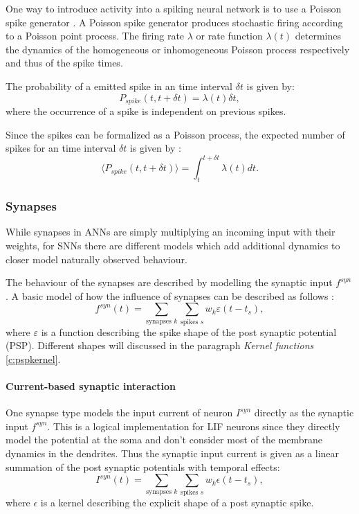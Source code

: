 One way to introduce activity into a spiking neural network is to use a Poisson spike generator \cite{Heeger2000}.
A Poisson spike generator produces stochastic firing according to a Poisson point process.
The firing rate $\lambda$ or rate function $\lambda(t)$ determines the dynamics of the homogeneous or inhomogeneous Poisson process respectively and thus of the spike times.   

The probability of a emitted spike in an time interval $\delta t$ is given by: 
\[
P_{spike}({t , t+ \delta t}) = \lambda(t) \delta t,
\]
where the occurrence of a spike is independent on previous spikes. 

Since the spikes can be formalized as a Poisson process, the expected number of spikes for an time interval $\delta t$ is given by :
\[
\langle  P_{spike}({t , t+ \delta t}) \rangle = \int_t^{t + \delta t} \lambda(t) dt.
\]


\subsubsection{Synapses} \label{c:synapses}

While synapses in ANNs are simply multiplying an incoming input with their weights, for SNNs there are different models which add additional dynamics to closer model naturally observed behaviour. 

The behaviour of the synapses are described by modelling the synaptic input $f^{syn}$. A basic model of how the influence of synapses can be described as follows \cite{Petrovici2016}:
\[
f^{syn}(t) = \sum_{\text{synapses } k } \sum_{\text{spikes } s} w_k \varepsilon(t - t_s),
\]
where $\varepsilon$ is a function describing the spike shape of the post synaptic potential (PSP).
Different shapes will discussed in the paragraph \textit{Kernel functions} \ref{c:pspkernel}.

\paragraph{Current-based synaptic interaction} \label{c:cuba}
One synapse type models the input current of neuron $I^{syn}$ directly as the synaptic input $f^{syn}$. This is a logical implementation for LIF neurons since they directly model the potential at the soma and don't consider most of the membrane dynamics in the dendrites. 
Thus the synaptic input current is given as a linear summation of the post synaptic potentials with temporal effects:
\[
I^{syn}(t) = \sum_{\text{synapses } k } \sum_{\text{spikes } s} w_k \epsilon(t - t_s),
\]
where $\epsilon$ is a kernel describing the explicit shape of a post synaptic spike.

